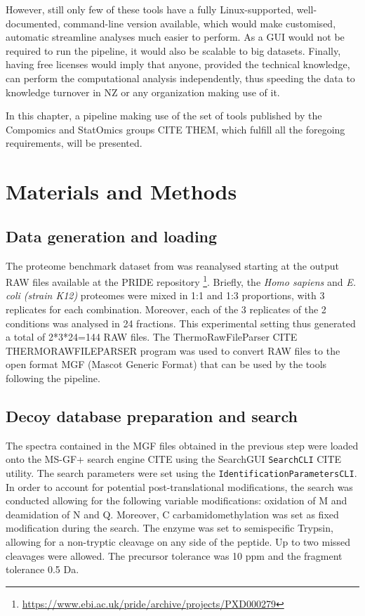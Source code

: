 \documentclass[11pt, a4paper]{report}
\begin{document}
However, still only few of these tools have a fully Linux-supported, well-documented, command-line version available, which would make customised, automatic streamline analyses much easier to perform. As a GUI would not be required to run the pipeline, it would also be scalable to big datasets. Finally, having free licenses would imply that anyone, provided the technical knowledge, can perform the computational analysis independently, thus speeding the data to knowledge turnover in \ac{NZ} or any organization making use of it.

In this chapter, a pipeline making use of the set of tools published by the Compomics  and StatOmics groups CITE THEM, which fulfill all the foregoing requirements, will be presented.

\section{Materials and Methods}

\subsection{Data generation and loading}

The proteome benchmark dataset from \cite{Cox2014} was reanalysed starting at the output RAW files available at the PRIDE repository \footnote{\href{https://www.ebi.ac.uk/pride/archive/projects/PXD000279}{https://www.ebi.ac.uk/pride/archive/projects/PXD000279}}. Briefly, the \textit{Homo sapiens} and \textit{E. coli (strain K12)} proteomes were mixed in 1:1 and 1:3 proportions, with 3 replicates for each combination. Moreover, each of the 3 replicates of the 2 conditions was analysed in 24 fractions. This experimental setting thus generated a total of 2*3*24=144 RAW files. The ThermoRawFileParser CITE THERMORAWFILEPARSER program was used to convert RAW files to the open format MGF (Mascot Generic Format) that can be used by the tools following the pipeline.


\subsection{Decoy database preparation and search}

The spectra contained in the MGF files obtained in the previous step were loaded onto the MS-GF+ search engine CITE using the SearchGUI \texttt{SearchCLI} CITE utility. The search parameters were set using the \texttt{IdentificationParametersCLI}. In order to account for potential post-translational modifications, the search was conducted allowing for the following variable modifications: oxidation of M and deamidation of N and Q. Moreover, C carbamidomethylation was set as fixed modification during the search. The enzyme was set to semispecific Trypsin, allowing for a non-tryptic cleavage on any side of the peptide. Up to two missed cleavages were allowed. The precursor tolerance was 10 ppm and the fragment tolerance 0.5 Da. 
\end{document}
